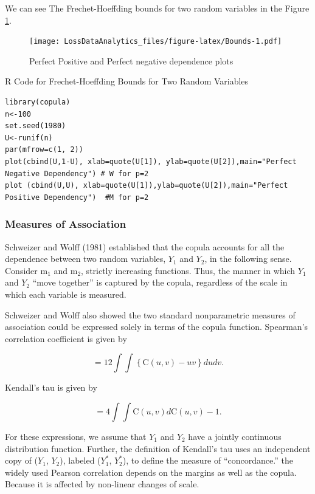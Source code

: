 \documentclass[]{book}
\theoremstyle{definition}
\theoremstyle{definition}
\theoremstyle{definition}
\theoremstyle{remark}
\begin{document}
We can see The Frechet-Hoeffding bounds for two random variables in the
Figure \ref{fig:Bounds}.

\begin{figure}
\centering
\texttt{[image: LossDataAnalytics\_files/figure-latex/Bounds-1.pdf]}
\caption{\label{fig:Bounds}Perfect Positive and Perfect negative dependence
plots}
\end{figure}

R Code for Frechet-Hoeffding Bounds for Two Random Variables

\hypertarget{display.plot.2}{}
\begin{verbatim}
library(copula)
n<-100
set.seed(1980)
U<-runif(n)
par(mfrow=c(1, 2))
plot(cbind(U,1-U), xlab=quote(U[1]), ylab=quote(U[2]),main="Perfect Negative Dependency") # W for p=2
plot (cbind(U,U), xlab=quote(U[1]),ylab=quote(U[2]),main="Perfect Positive Dependency")  #M for p=2
\end{verbatim}

\subsubsection{Measures of Association}\label{measures-of-association}

Schweizer and Wolff (1981) established that the copula accounts for all
the dependence between two random variables, \(Y_1\) and \(Y_2\), in the
following sense. Consider m\(_1\) and m\(_2\), strictly increasing
functions. Thus, the manner in which \(Y_1\) and \(Y_2\) ``move
together'' is captured by the copula, regardless of the scale in which
each variable is measured.

Schweizer and Wolff also showed the two standard nonparametric measures
of association could be expressed solely in terms of the copula
function. Spearman's correlation coefficient is given by

\[= 12 \int \int \left\{\mathrm{C}(u,v) - uv \right\} du dv.\]

Kendall's tau is given by

\[= 4 \int \int \mathrm{C}(u,v)d\mathrm{C}(u,v) - 1 .\]

For these expressions, we assume that \(Y_1\) and \(Y_2\) have a jointly
continuous distribution function. Further, the definition of Kendall's
tau uses an independent copy of (\(Y_1\), \(Y_2\)), labeled
(\(Y_1^{\ast}\), \(Y_2^{\ast}\)), to define the measure of
``concordance.'' the widely used Pearson correlation depends on the
margins as well as the copula. Because it is affected by non-linear
changes of scale.
\end{document}
